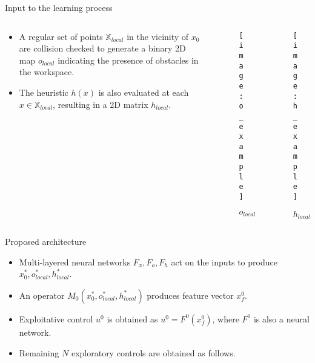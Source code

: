
\begin{columns}[t]
	\begin{column}{0.68\textwidth}
		\vspace{-0.1in}
		\begin{block} {\large Input to the learning process}
			\begin{columns}[T]
				\centering
				\begin{column}{0.59\textwidth}
					\begin{itemize}
						\item A regular set of points $\mathbb{X}_{local}$ in the vicinity of $x_0$ are collision checked to generate a binary 2D map $o_{local}$ indicating the presence of obstacles in the workspace.
						\item The heuristic $h(x)$ is also evaluated at each $x \in \mathbb{X}_{local}$, resulting in a 2D matrix $h_{local}$.
					\end{itemize}
				\end{column}
				\begin{column}{0.20\textwidth}
					\centering
					\begin{figure}
					\texttt{[image: o\_example]}
					\caption{$o_{local}$} 
					\end{figure}
				\end{column}
				\begin{column}{0.20\textwidth}
					\centering
					\begin{figure}
					\texttt{[image: h\_example]}
					\caption{$h_{local}$} 
					\end{figure}
					\vspace{0.1in}
				\end{column}
			\end{columns}
		\end{block}
		\vspace{-0.1in}
		\begin{block}{\large Proposed architecture}
			\begin{itemize}
			\item Multi-layered neural networks $F_x, F_o, F_h$ act on the inputs to produce $x_0^*, o_{local}^*, h_{local}^*$. 
			\item An operator $M_0(x_0^*, o_{local}^*,h_{local}^*)$ produces feature vector  $x_f^0$.
			\item Exploitative control $u^0$ is obtained as $u^0 = F^0(x_f^0)$, where $F^0$ is also a neural network.
			\item Remaining $N$ exploratory controls are obtained as follows.

\end{itemize}
\end{block}
\end{column}
\end{columns}
